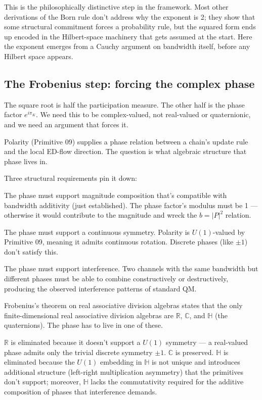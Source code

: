 \documentclass[11pt,a4paper]{article}
\begin{document}
This is the philosophically distinctive step in the framework. Most other derivations of the Born rule don't address why the exponent is 2; they show that some structural commitment forces a probability rule, but the squared form ends up encoded in the Hilbert-space machinery that gets assumed at the start. Here the exponent emerges from a Cauchy argument on bandwidth itself, before any Hilbert space appears.

\subsection{The Frobenius step: forcing the complex phase}

The square root is half the participation measure. The other half is the phase factor $e^{i\pi_K}$. We need this to be complex-valued, not real-valued or quaternionic, and we need an argument that forces it.

Polarity (Primitive 09) supplies a phase relation between a chain's update rule and the local ED-flow direction. The question is what algebraic structure that phase lives in.

Three structural requirements pin it down:

The phase must support magnitude composition that's compatible with bandwidth additivity (just established). The phase factor's modulus must be 1 --- otherwise it would contribute to the magnitude and wreck the $b = |P|^2$ relation.

The phase must support a continuous symmetry. Polarity is $U(1)$-valued by Primitive 09, meaning it admits continuous rotation. Discrete phases (like $\pm 1$) don't satisfy this.

The phase must support interference. Two channels with the same bandwidth but different phases must be able to combine constructively or destructively, producing the observed interference patterns of standard QM.

Frobenius's theorem on real associative division algebras states that the only finite-dimensional real associative division algebras are $\mathbb{R}$, $\mathbb{C}$, and $\mathbb{H}$ (the quaternions). The phase has to live in one of these.

$\mathbb{R}$ is eliminated because it doesn't support a $U(1)$ symmetry --- a real-valued phase admits only the trivial discrete symmetry $\pm 1$. $\mathbb{C}$ is preserved. $\mathbb{H}$ is eliminated because the $U(1)$ embedding in $\mathbb{H}$ is not unique and introduces additional structure (left-right multiplication asymmetry) that the primitives don't support; moreover, $\mathbb{H}$ lacks the commutativity required for the additive composition of phases that interference demands.
\end{document}
